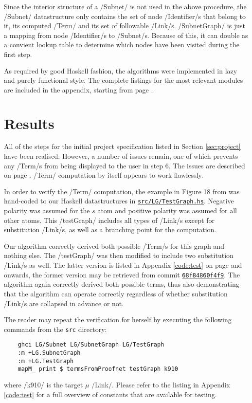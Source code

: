 \documentclass[12pt,a4paper]{article}
\newcommand{\coderef}[1]{\href{https://github.com/jgonggrijp/net-prove/blob/report/#1}{\texttt{#1}}}
\begin{document}
Since the interior structure of a \hs/Subnet/ is not used in the above procedure, the \hs/Subnet/ datastructure only contains the set of node \hs/Identifier/s that belong to it, its computed \hs/Term/ and its set of followable \hs/Link/s. \hs/SubnetGraph/ is just a mapping from node \hs/Identifier/s to \hs/Subnet/s. Because of this, it can double as a convient lookup table to determine which nodes have been visited during the first step.

As required by good Haskell fashion, the algorithms were implemented in lazy and purely functional style. The complete listings for the most relevant modules are included in the appendix, starting from page \pageref{code}.


\section{Results}

All of the steps for the initial project specification listed in Section \ref{sec:project} have been realised. However, a number of issues remain, one of which prevents any \hs/Term/s from being displayed to the user in step 6. The issues are described on page \pageref{sub:issues}. \hs/Term/ computation by itself appears to work flawlessly.

In order to verify the \hs/Term/ computation, the example in Figure 18 from \cite[p.~28]{mm12} was hand-coded to our Haskell datastructures in \coderef{src/LG/TestGraph.hs}. Negative polarity was assumed for the $s$ atom and positive polarity was assumed for all other atoms. This \hs/testGraph/ includes all types of \hs/Link/s except for substitution \hs/Link/s, as well as a branching point for the computation.

Our algorithm correctly derived both possible \hs/Term/s for this graph and nothing else. The \hs/testGraph/ was then modified to include two substitution \hs/Link/s as well. The latter version is listed in Appendix \ref{code:test} on page \pageref{code:test} and onwards, the former version may be retrieved from commit \href{https://github.com/jgonggrijp/net-prove/blob/68f84860f4f9535e15a12161f5120fb25f6b4219/src/LG/TestGraph.hs}{\texttt{68f84860f4f9}}. The algorithm again correctly derived both possible terms, thus also demonstrating that the algorithm can operate correctly regardless of whether substitution \hs/Link/s are collapsed in advance or not.

The reader may repeat the verification for herself by executing the following commands from the \texttt{src} directory:
\begin{verbatim}
    ghci LG/Subnet LG/SubnetGraph LG/TestGraph
    :m +LG.SubnetGraph 
    :m +LG.TestGraph
    mapM_ print $ termsFromProofnet testGraph k910
\end{verbatim}
where \hs/k910/ is the target $\mu$ \hs/Link/. Please refer to the listing in Appendix \ref{code:test} for a full overview of constants that are available for testing.
\end{document}
